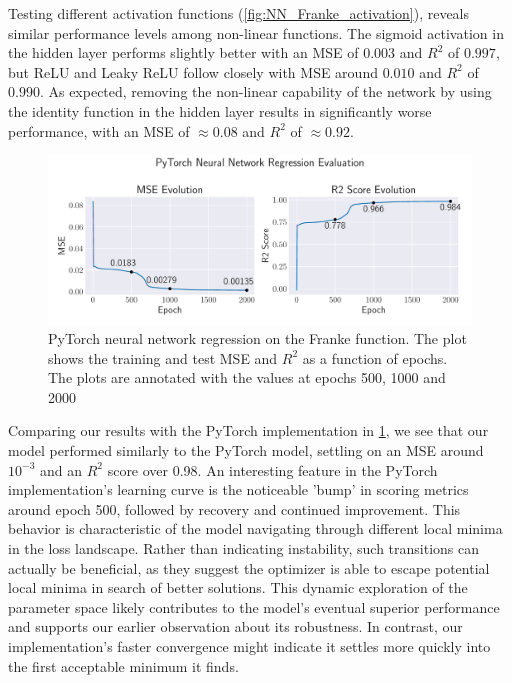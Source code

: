 Testing different activation functions (\cref{fig:NN_Franke_activation}), reveals similar performance levels among non-linear functions. The sigmoid activation in the hidden layer performs slightly better with an MSE of $0.003$ and $R^2$ of $0.997$, but ReLU and Leaky ReLU follow closely with MSE around $0.010$ and $R^2$ of $0.990$. As expected, removing the non-linear capability of the network by using the identity function in the hidden layer results in significantly worse performance, with an MSE of $\approx0.08$ and $R^2$ of $\approx0.92$.

\onecolumngrid
\begin{figure}[h!]
    \begin{minipage}{\textwidth}
        \centering
        \includegraphics[width = .9\textwidth]{../figs/nn_torch_franke.pdf}
        \caption{PyTorch neural network regression on the Franke function. The plot shows the training and test MSE and \( R^2 \) as a function of epochs. The plots are annotated with the values at epochs 500, 1000 and 2000}
        \label{fig:NN_Torch_scores}
    \end{minipage}
\end{figure}
\twocolumngrid

Comparing our results with the PyTorch implementation in \cref{fig:NN_Torch_scores}, we see that our model performed similarly to the PyTorch model, settling on an MSE around \( 10^{-3} \) and an \( R^2 \) score over 0.98. An interesting feature in the PyTorch implementation's learning curve is the noticeable 'bump' in scoring metrics around epoch 500, followed by recovery and continued improvement. This behavior is characteristic of the model navigating through different local minima in the loss landscape. Rather than indicating instability, such transitions can actually be beneficial, as they suggest the optimizer is able to escape potential local minima in search of better solutions. This dynamic exploration of the parameter space likely contributes to the model's eventual superior performance and supports our earlier observation about its robustness. In contrast, our implementation's faster convergence might indicate it settles more quickly into the first acceptable minimum it finds.

